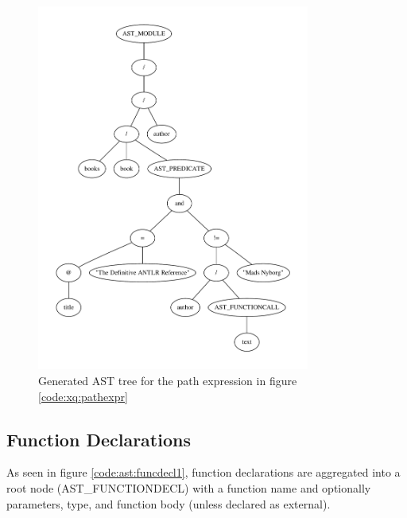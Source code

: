 \pagebreak
\begin{figure}[h!]

\caption{Path expression example, generates AST seen in figure \ref{tree:ast:pathexpr}}
\label{code:xq:pathexpr}
\centering
 \includegraphics[width=0.8\textwidth]{img/graphs/pathexpr}
\caption{Generated AST tree for the path expression in figure 
\ref{code:xq:pathexpr}}
\label{tree:ast:pathexpr}
\end{figure}

\subsection{Function Declarations}

As seen in figure \ref{code:ast:funcdecl1}, function declarations are aggregated
into a root node (AST\_FUNCTIONDECL) with a function name and optionally
parameters, type, and function body (unless declared as external).

